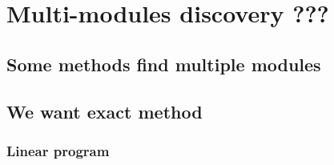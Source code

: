 \chapter{Multi-modules discovery ???}

\section{Some methods find multiple modules}

\section{We want exact method}

 \subsection{Linear program}
